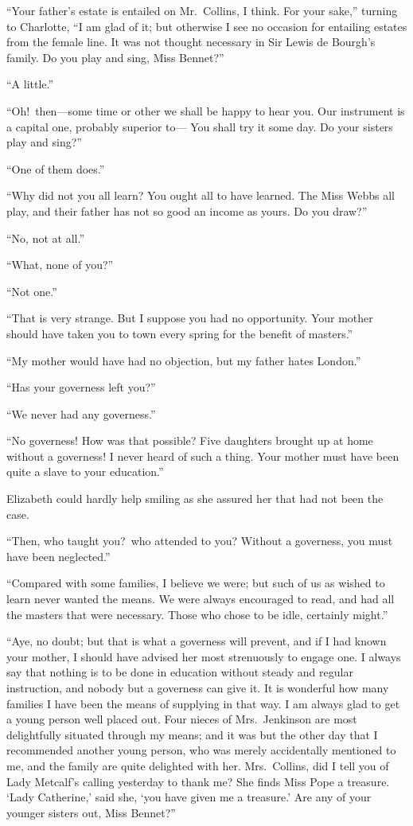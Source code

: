 \documentclass[12pt,english]{book}
\begin{document}
{}``Your father's estate is entailed on Mr.\ Collins, I think. For
your sake,'' turning to Charlotte, {}``I am glad of it; but otherwise
I see no occasion for entailing estates from the female line. It was
not thought necessary in Sir Lewis de Bourgh's family. Do you play
and sing, Miss Bennet?''\ 

{}``A little.''

{}``Oh!\ then\mbox{---}some time or other we shall be happy to
hear you. Our instrument is a capital one, probably superior to\mbox{---}
You shall try it some day. Do your sisters play and sing?''\ 

{}``One of them does.''

{}``Why did not you all learn? You ought all to have learned. The
Miss Webbs all play, and their father has not so good an income as
yours. Do you draw?''\ 

{}``No, not at all.''

{}``What, none of you?''\ 

{}``Not one.''

{}``That is very strange. But I suppose you had no opportunity. Your
mother should have taken you to town every spring for the benefit
of masters.''

{}``My mother would have had no objection, but my father hates London.''

{}``Has your governess left you?''\ 

{}``We never had any governess.''

{}``No governess! How was that possible? Five daughters brought up
at home without a governess! I never heard of such a thing. Your mother
must have been quite a slave to your education.''

Elizabeth could hardly help smiling as she assured her that had not
been the case.

{}``Then, who taught you?\ who attended to you? Without a governess,
you must have been neglected.''

{}``Compared with some families, I believe we were; but such of us
as wished to learn never wanted the means. We were always encouraged
to read, and had all the masters that were necessary. Those who chose
to be idle, certainly might.''

{}``Aye, no doubt; but that is what a governess will prevent, and
if I had known your mother, I should have advised her most strenuously
to engage one. I always say that nothing is to be done in education
without steady and regular instruction, and nobody but a governess
can give it. It is wonderful how many families I have been the means
of supplying in that way. I am always glad to get a young person well
placed out. Four nieces of Mrs.\ Jenkinson are most delightfully
situated through my means; and it was but the other day that I recommended
another young person, who was merely accidentally mentioned to me,
and the family are quite delighted with her. Mrs.\ Collins, did I
tell you of Lady Metcalf's calling yesterday to thank me? She finds
Miss Pope a treasure. `Lady Catherine,' said she, `you have given
me a treasure.' Are any of your younger sisters out, Miss Bennet?''\ 
\end{document}

